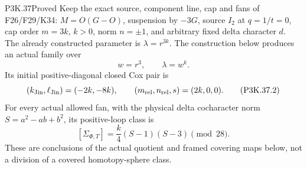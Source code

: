 \begin{statement}{P3K.37}{Proved}
Keep the exact source, component line, cap and fans of F26/F29/K34:
\(M=O(G-O)\), suspension by \(-3G\), source \(I_2\) at
\(q=1/t=0\), cap order \(m=3k\), \(k>0\), norm
\(n=\pm1\), and arbitrary fixed delta character \(d\).
The already constructed parameter is \(\lambda=r^{3k}\).
The construction below produces an actual family over
\[
 w=r^3,\qquad \lambda=w^k.                                      \tag{P3K.37.1}
\]
Its initial positive-diagonal closed Cox pair is
\[
 (k_{\rm Jin},\ell_{\rm Jin})=(-2k,-8k),\qquad
 (m_{\rm rel},n_{\rm rel},s)=(2k,0,0).
                                                                    \tag{P3K.37.2}
\]
For every actual allowed fan, with the physical delta cocharacter norm
\(S=a^2-ab+b^2\), its positive-loop class is
\[
 [\Sigma_{\Phi,T}]=\frac{k}{4}(S-1)(S-3)\pmod {28}.              \tag{P3K.37.3}
\]
These are conclusions of the actual quotient and framed covering maps below,
not a division of a covered homotopy-sphere class.
\end{statement}

